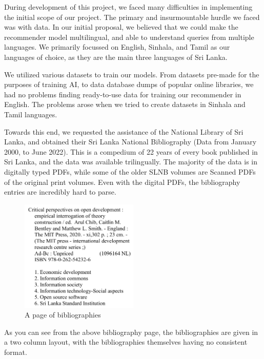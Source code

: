 During development of this project, we faced many difficulties in implementing the initial scope of our project. The primary and insurmountable hurdle we faced was with data. In our initial proposal, we believed that we could make the recommender model multilingual, and able to understand queries from multiple languages. We primarily focussed on English, Sinhala, and Tamil as our languages of choice, as they are the main three languages of Sri Lanka.

We utilized various datasets to train our models. From datasets pre-made for the purposes of training AI, to data database dumps of popular online libraries, we had no problems finding ready-to-use data for training our recommender in English. The problems arose when we tried to create datasets in Sinhala and Tamil languages.

Towards this end, we requested the assistance of the National Library of Sri Lanka, and obtained their Sri Lanka National Bibliography (Data from January 2000, to June 2022). This is a compedium of 22 years of every book published in Sri Lanka, and the data was available trilingually. The majority of the data is in digitally typed PDFs, while some of the older SLNB volumes are Scanned PDFs of the original print volumes. Even with the digital PDFs, the bibliography entries are incredibly hard to parse.

\begin{figure}[htbp]
    \centering
    \includegraphics[width=0.5\textwidth]{../../assets/snlb_entry.png}
    \caption{A page of bibliographies}
    \label{fig:slnbpage}
\end{figure}

As you can see from the above bibliography page, the bibliographies are given in a two column layout, with the bibliographies themselves having no consistent format.


